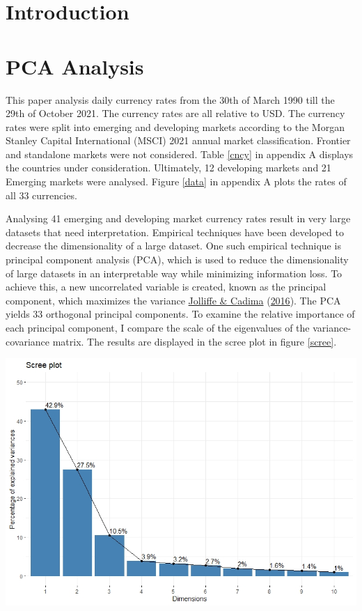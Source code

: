 \documentclass[11pt,preprint, authoryear]{elsarticle}
\let\origfigure\figure
\let\endorigfigure\endfigure
\renewenvironment{figure}[1][2] {
    \expandafter\origfigure\expandafter[H]
} {
    \endorigfigure
}
\numberwithin{equation}{section}
\numberwithin{figure}{section}
\numberwithin{table}{section}
\begin{document}
\headsep 35pt %




\hypertarget{introduction}{%
\section{\texorpdfstring{Introduction
\label{Introduction}}{Introduction }}\label{introduction}}

\hypertarget{pca-analysis}{%
\section{PCA Analysis}\label{pca-analysis}}

This paper analysis daily currency rates from the 30th of March 1990
till the 29th of October 2021. The currency rates are all relative to
USD. The currency rates were split into emerging and developing markets
according to the Morgan Stanley Capital International (MSCI) 2021 annual
market classification. Frontier and standalone markets were not
considered. Table \ref{cncy} in appendix A displays the countries under
consideration. Ultimately, 12 developing markets and 21 Emerging markets
were analysed. Figure \ref{data} in appendix A plots the rates of all 33
currencies.

Analysing 41 emerging and developing market currency rates result in
very large datasets that need interpretation. Empirical techniques have
been developed to decrease the dimensionality of a large dataset. One
such empirical technique is principal component analysis (PCA), which is
used to reduce the dimensionality of large datasets in an interpretable
way while minimizing information loss. To achieve this, a new
uncorrelated variable is created, known as the principal component,
which maximizes the variance \protect\hyperlink{ref-jolli}{Jolliffe \&
Cadima} (\protect\hyperlink{ref-jolli}{2016}). The PCA yields 33
orthogonal principal components. To examine the relative importance of
each principal component, I compare the scale of the eigenvalues of the
variance-covariance matrix. The results are displayed in the scree plot
in figure \ref{scree}.

\begin{figure}[h]
\centering
\includegraphics[scale=0.7]{scree.jpg}
\caption{Scree plot}
\label{scree}
\end{figure}
\end{document}
